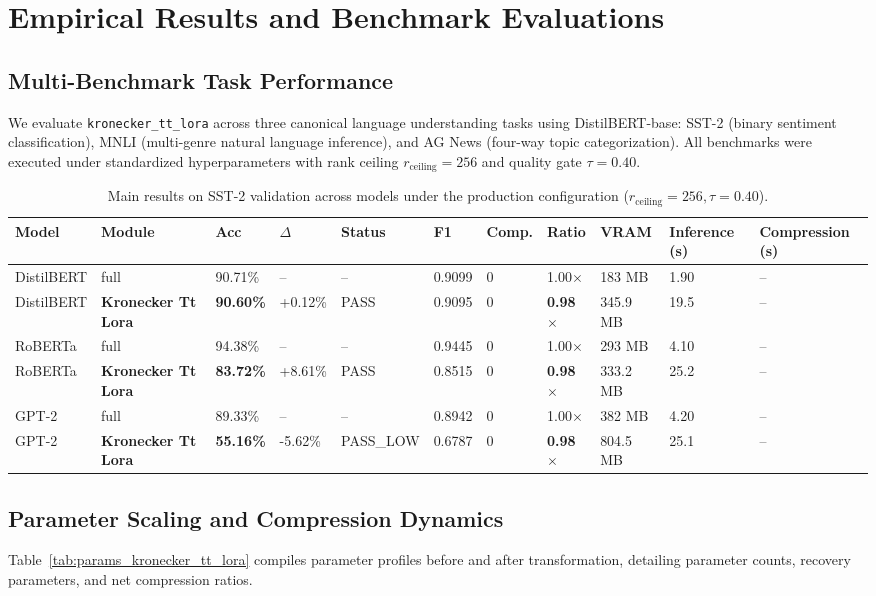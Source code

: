 \section{Empirical Results and Benchmark Evaluations}
\label{sec:results}

\subsection{Multi-Benchmark Task Performance}
We evaluate \texttt{kronecker\_tt\_lora} across three canonical language understanding tasks using DistilBERT-base: SST-2 (binary sentiment classification), MNLI (multi-genre natural language inference), and AG News (four-way topic categorization). All benchmarks were executed under standardized hyperparameters with rank ceiling $r_{\mathrm{ceiling}} = 256$ and quality gate $\tau = 0.40$.

\begin{table}[t]
\centering
\small
\begin{tabular}{lllllllllll}
\toprule
\textbf{Model} & \textbf{Module} & \textbf{Acc} & \textbf{$\Delta$} & \textbf{Status} & \textbf{F1} & \textbf{Comp.} & \textbf{Ratio} & \textbf{VRAM} & \textbf{Inference (s)} & \textbf{Compression (s)} \\
\midrule
DistilBERT & full & 90.71\% & -- & -- & 0.9099 & 0 & 1.00$\times$ & 183 MB & 1.90 & -- \\
DistilBERT & \textbf{Kronecker Tt Lora} & \textbf{90.60\%} & +0.12\% & PASS & 0.9095 & 0 & \textbf{0.98$\times$} & 345.9 MB & 19.5 & -- \\
RoBERTa & full & 94.38\% & -- & -- & 0.9445 & 0 & 1.00$\times$ & 293 MB & 4.10 & -- \\
RoBERTa & \textbf{Kronecker Tt Lora} & \textbf{83.72\%} & +8.61\% & PASS & 0.8515 & 0 & \textbf{0.98$\times$} & 333.2 MB & 25.2 & -- \\
GPT-2 & full & 89.33\% & -- & -- & 0.8942 & 0 & 1.00$\times$ & 382 MB & 4.20 & -- \\
GPT-2 & \textbf{Kronecker Tt Lora} & \textbf{55.16\%} & -5.62\% & PASS\_LOW & 0.6787 & 0 & \textbf{0.98$\times$} & 804.5 MB & 25.1 & -- \\
\bottomrule
\end{tabular}
\caption{Main results on SST-2 validation across models under the production configuration ($r_{\mathrm{ceiling}}=256, \tau=0.40$).}
\label{tab:main_sst2}
\end{table}

\subsection{Parameter Scaling and Compression Dynamics}
Table~\ref{tab:params_kronecker_tt_lora} compiles parameter profiles before and after transformation, detailing parameter counts, recovery parameters, and net compression ratios.

